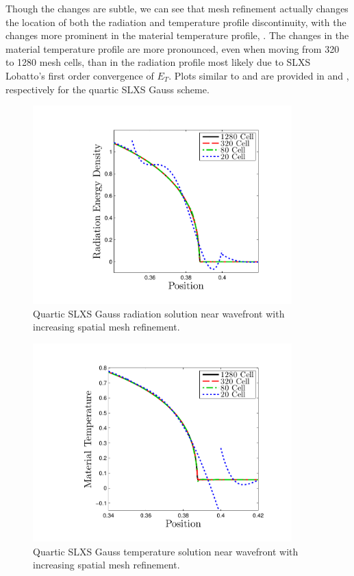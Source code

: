 Though the changes are subtle, we can see that mesh refinement actually changes the location of both the radiation and temperature profile discontinuity, with the changes more prominent in the material temperature profile, .
The changes in the material temperature profile are more pronounced, even when moving from 320 to 1280 mesh cells, than in the radiation profile most likely due to SLXS Lobatto's first order convergence of $E_{T}$.
Plots similar to  and  are provided in  and , respectively for the quartic SLXS Gauss scheme.
\begin{figure}[!hbp]
\centering
\includegraphics[width=10cm,trim=1.0in  0.2in 0.5in 0.5in,clip=true]{chapter6_grey_radtran/Dissertation_Data/Reorder_Marshak_Zoom_Radiation_SL_Gauss_P4_Cell_Refinement.pdf}
\caption{Quartic SLXS Gauss radiation solution near wavefront with increasing spatial mesh refinement.}
\label{fig:gauss_convergence_rad}
\end{figure}
%
%
\begin{figure}[!htp]
\centering
\includegraphics[width=10cm,trim=1.0in  0.2in 0.5in 0.5in,clip=true]{chapter6_grey_radtran/Dissertation_Data/Reorder_Marshak_Zoom_Temperature_SL_Gauss_P4_Cell_Refinement.pdf}
\caption{Quartic SLXS Gauss temperature solution near wavefront with increasing spatial mesh refinement.}
\label{fig:gauss_convergence_temp}
\end{figure}
